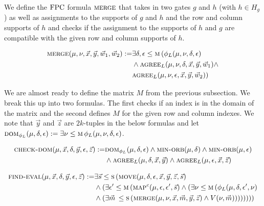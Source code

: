 \documentclass[../paper.tex]{subfiles}
\begin{document}
We define the $\text{\upshape FPC}$ formula $\textsc{merge}$ that takes in two gates $g$ and $h$
(with $h \in H_g$) as well as assignments to the supports of $g$ and $h$ and the
row and column supports of $h$ and checks if the assignment to the supports
of $h$ and $g$ are compatible with the given row and column supports of $h$.
				
				
\begin{align*}
	\textsc{merge} (\mu, \nu, \vec{x}, \vec{y}, \vec{w}_1, \vec{w}_2) := & \exists \delta, \epsilon \leq \textsc{m} \, ( \phi_L (\mu, \nu, \delta, \epsilon) \\ & \land \textsc{agree}_L (\mu, \nu , \delta, \vec{x}, \vec{y}, \vec{w}_1) \land \\ & \textsc{agree}_L (\mu, \nu , \epsilon, \vec{x}, \vec{y}, \vec{w}_2))
\end{align*}
				
We are almost ready to define the matrix $M$ from the previous subsection. We
break this up into two formulas. The first checks if an index is in the
domain of the matrix and the second defines $M$ for the given row and column
indexes. We note that $\vec{y}$ and $\vec{z}$ are $2k$-tuples in the below formulas and let $\textsc{dom}_{\phi_L} (\mu, \delta, \epsilon) := \exists \nu \leq \textsc{m} \, \phi_L (\mu, \nu, \delta, \epsilon)$.
				
\begin{align*}
	\textsc{check-dom}(\mu, \vec{x}, \delta, \vec{y}, \epsilon, \vec{z})  := & \textsc{dom}_{\phi_L} (\mu, \delta, \epsilon) \land \textsc{min-orb}(\mu, \delta)\land \textsc{min-orb} (\mu, \epsilon) \\ & \land \textsc{agree}_L (\mu, \delta , \vec{x}, \vec{y}) \land \textsc{agree}_L (\mu, \epsilon , \vec{x}, \vec{z}) 
\end{align*}

\begin{align*}
	\textsc{find-eval} (\mu, \vec{x}, \delta, \vec{y}, \epsilon, \vec{z}) := & \exists \vec{s} \leq \textsc{s} \, (\textsc{move}(\mu, \delta, \epsilon, \vec{x}, \vec{y}, \vec{z}, \vec{s}) \\ & \land (\exists \epsilon' \leq \textsc{m} \, (\textsc{map}^c (\mu, \epsilon, \epsilon', \vec{s}) \land (\exists \nu \leq \textsc{m} \, (\phi_L (\mu, \delta, \epsilon', \nu) \\ & \land (\exists \vec{m} \, \leq \textsc{s} \, (\textsc{merge} (\mu, \nu, \vec{x}, \vec{m}, \vec{y}, \vec{z}) \land V(\nu, \vec{m}))))))))
\end{align*}
				
\end{document}
